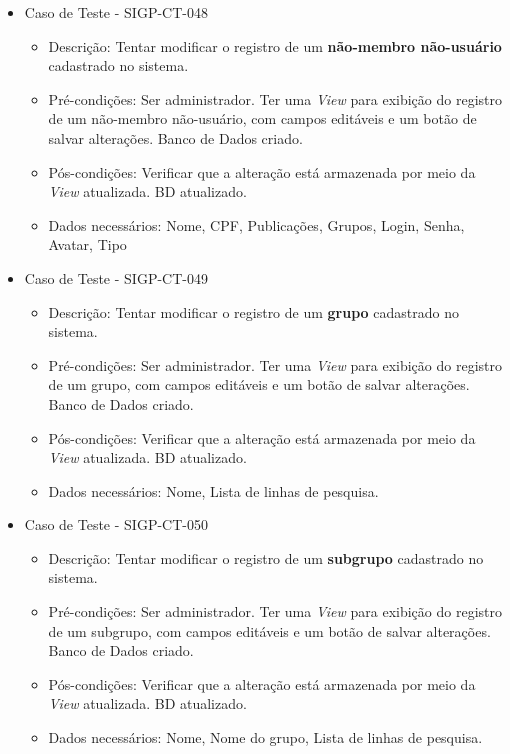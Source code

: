 \documentclass[11pt, a4paper]{book}
\begin{document}
\begin{itemize}
	\item Caso de Teste - SIGP-CT-048
	\begin{itemize}
	\item Descrição: Tentar modificar o registro de um  \textbf{não-membro não-usuário} cadastrado no sistema.
	\item Pré-condições: Ser administrador. Ter uma \emph{View} para exibição do registro de um não-membro não-usuário, com campos editáveis e um botão de salvar alterações. Banco de Dados criado.
\item Pós-condições:  Verificar que a alteração está armazenada por meio da \emph{View} atualizada. BD atualizado.
	\item Dados necessários:  Nome, CPF, Publicações, Grupos, Login, Senha, Avatar, Tipo
	\end{itemize}

	\item Caso de Teste - SIGP-CT-049
	\begin{itemize}
	\item Descrição: Tentar modificar o registro de um  \textbf{grupo} cadastrado no sistema.
	\item Pré-condições: Ser administrador. Ter uma \emph{View} para exibição do registro de um grupo, com campos editáveis e um botão de salvar alterações. Banco de Dados criado.
\item Pós-condições:  Verificar que a alteração está armazenada por meio da \emph{View} atualizada. BD atualizado.
	\item Dados necessários: Nome, Lista de linhas de pesquisa.
	\end{itemize}

	\item Caso de Teste - SIGP-CT-050
	\begin{itemize}
	\item Descrição: Tentar modificar o registro de um  \textbf{subgrupo} cadastrado no sistema.
	\item Pré-condições: Ser administrador. Ter uma \emph{View} para exibição do registro de um subgrupo, com campos editáveis e um botão de salvar alterações. Banco de Dados criado.
	\item Pós-condições:  Verificar que a alteração está armazenada por meio da \emph{View} atualizada. BD atualizado.
	\item Dados necessários: Nome, Nome do grupo, Lista de linhas de pesquisa.
	\end{itemize}

\newpage


\end{itemize}
\end{document}
